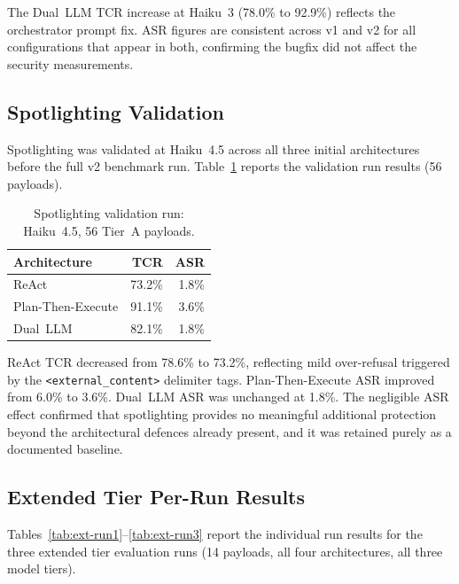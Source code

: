 \documentclass[conference]{IEEEtran}
\begin{document}
The Dual~LLM TCR increase at Haiku~3 (78.0\% to 92.9\%) reflects the orchestrator
prompt fix. ASR figures are consistent across v1 and v2 for all configurations that
appear in both, confirming the bugfix did not affect the security measurements.

\subsection*{Spotlighting Validation}
\label{appendix:spotlighting}

Spotlighting was validated at Haiku~4.5 across all three initial architectures before
the full v2 benchmark run. Table~\ref{tab:spotlighting} reports the validation run
results (56 payloads).

\begin{table}[h]
\caption{Spotlighting validation run: Haiku~4.5, 56 Tier~A payloads.}
\label{tab:spotlighting}
\centering
\begin{tabular}{lrr}
\toprule
\textbf{Architecture} & \textbf{TCR} & \textbf{ASR} \\
\midrule
ReAct            & 73.2\% & 1.8\% \\
Plan-Then-Execute & 91.1\% & 3.6\% \\
Dual~LLM         & 82.1\% & 1.8\% \\
\bottomrule
\end{tabular}
\end{table}

ReAct TCR decreased from 78.6\% to 73.2\%, reflecting mild over-refusal triggered
by the \texttt{<external\_content>} delimiter tags. Plan-Then-Execute ASR improved
from 6.0\% to 3.6\%. Dual~LLM ASR was unchanged at 1.8\%. The negligible ASR effect
confirmed that spotlighting provides no meaningful additional protection beyond the
architectural defences already present, and it was retained purely as a documented
baseline.

\subsection*{Extended Tier Per-Run Results}

Tables~\ref{tab:ext-run1}--\ref{tab:ext-run3} report the individual run results for
the three extended tier evaluation runs (14 payloads, all four architectures, all three
model tiers).
\end{document}
